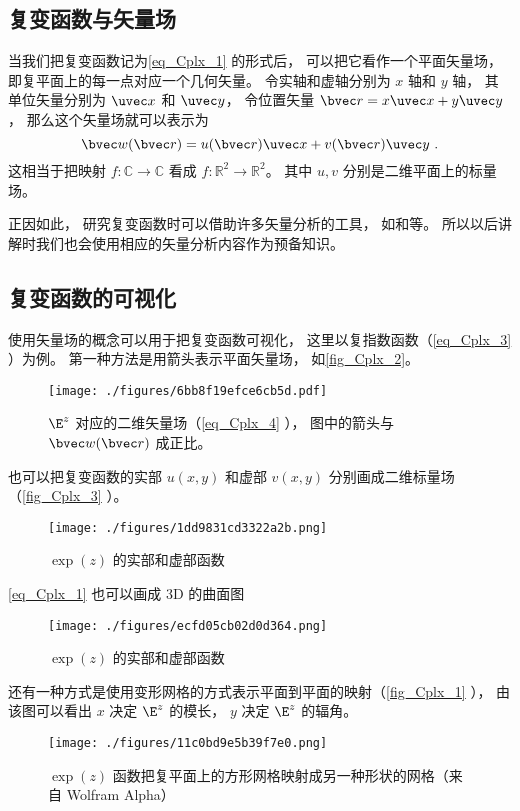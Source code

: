 \subsection{复变函数与矢量场}
当我们把复变函数记为\autoref{eq_Cplx_1} 的形式后， 可以把它看作一个平面矢量场， 即复平面上的每一点对应一个几何矢量。 令实轴和虚轴分别为 $x$ 轴和 $y$ 轴， 其单位矢量分别为 $\uvec x$ 和 $\uvec y$， 令位置矢量 $\bvec r = x \uvec x + y \uvec y$， 那么这个矢量场就可以表示为
\begin{equation}\label{eq_Cplx_4}
\bvec w(\bvec r) = u(\bvec r) \uvec x + v(\bvec r) \uvec y~.
\end{equation}
这相当于把映射 $f:\mathbb C \to \mathbb C$ 看成 $f: \mathbb R^2 \to \mathbb R^2$。 其中 $u, v$ 分别是二维平面上的标量场。

正因如此， 研究复变函数时可以借助许多矢量分析的工具， 如和等。 所以以后讲解时我们也会使用相应的矢量分析内容作为预备知识。

\subsection{复变函数的可视化}
使用矢量场的概念可以用于把复变函数可视化， 这里以复指数函数（\autoref{eq_Cplx_3} ）为例。 第一种方法是用箭头表示平面矢量场， 如\autoref{fig_Cplx_2}。
\begin{figure}[ht]
\centering
\texttt{[image: ./figures/6bb8f19efce6cb5d.pdf]}
\caption{$\E^z$ 对应的二维矢量场（\autoref{eq_Cplx_4} ）， 图中的箭头与 $\bvec w(\bvec r)$ 成正比。} \label{fig_Cplx_2}
\end{figure}
也可以把复变函数的实部 $u(x,y)$ 和虚部 $v(x, y)$ 分别画成二维标量场（\autoref{fig_Cplx_3} ）。
\begin{figure}[ht]
\centering
\texttt{[image: ./figures/1dd9831cd3322a2b.png]}
\caption{$\exp(z)$ 的实部和虚部函数} \label{fig_Cplx_3}
\end{figure}
\autoref{eq_Cplx_1} 也可以画成 3D 的曲面图
\begin{figure}[ht]
\centering
\texttt{[image: ./figures/ecfd05cb02d0d364.png]}
\caption{$\exp(z)$ 的实部和虚部函数} \label{fig_Cplx_4}
\end{figure}

还有一种方式是使用变形网格的方式表示平面到平面的映射（\autoref{fig_Cplx_1} ）， 由该图可以看出 $x$ 决定 $\E^z$ 的模长， $y$ 决定 $\E^z$ 的辐角。
\begin{figure}[ht]
\centering
\texttt{[image: ./figures/11c0bd9e5b39f7e0.png]}
\caption{$\exp(z)$ 函数把复平面上的方形网格映射成另一种形状的网格（来自 Wolfram Alpha）} \label{fig_Cplx_1}
\end{figure}

